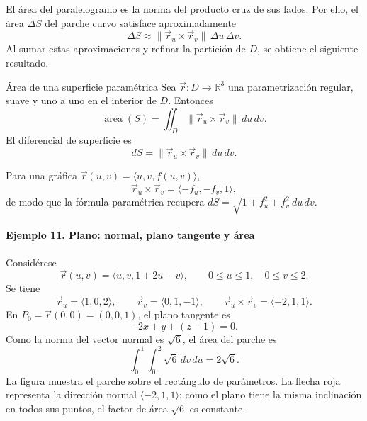 El área del paralelogramo es la norma del producto cruz de sus lados. Por ello, el área $\Delta S$ del parche curvo satisface aproximadamente
\[
\Delta S\approx
\lVert\vec r_u\times\vec r_v\rVert\,\Delta u\,\Delta v.
\]
Al sumar estas aproximaciones y refinar la partición de $D$, se obtiene el siguiente resultado.

\begin{mytheorem}{Área de una superficie paramétrica}
Sea $\vec r:D\to\mathbb R^3$ una parametrización regular, suave y uno a uno en el interior de $D$. Entonces
\[
\operatorname{area}(S)
=\iint_D\lVert\vec r_u\times\vec r_v\rVert\,du\,dv.
\]
El diferencial de superficie es
\[
dS=\lVert\vec r_u\times\vec r_v\rVert\,du\,dv.
\]
\end{mytheorem}

Para una gráfica $\vec r(u,v)=\langle u,v,f(u,v)\rangle$,
\[
\vec r_u\times\vec r_v
=\langle-f_u,-f_v,1\rangle,
\]
de modo que la fórmula paramétrica recupera
$dS=\sqrt{1+f_u^2+f_v^2}\,du\,dv$.

\paragraph{Ejemplo 11. Plano: normal, plano tangente y área}
Considérese
\[
\vec r(u,v)=\langle u,v,1+2u-v\rangle,
\qquad0\leq u\leq1,\quad0\leq v\leq2.
\]
Se tiene
\[
\vec r_u=\langle1,0,2\rangle,
\qquad
\vec r_v=\langle0,1,-1\rangle,
\qquad
\vec r_u\times\vec r_v=\langle-2,1,1\rangle.
\]
En $P_0=\vec r(0,0)=(0,0,1)$, el plano tangente es
\[
-2x+y+(z-1)=0.
\]
Como la norma del vector normal es $\sqrt6$, el área del parche es
\[
\int_0^1\int_0^2\sqrt6\,dv\,du=2\sqrt6.
\]
La figura muestra el parche sobre el rectángulo de parámetros. La flecha roja representa la dirección normal $\langle-2,1,1\rangle$; como el plano tiene la misma inclinación en todos sus puntos, el factor de área $\sqrt6$ es constante.

\begingroup\shorthandoff{>}
\begin{center}
\end{center}
\endgroup

